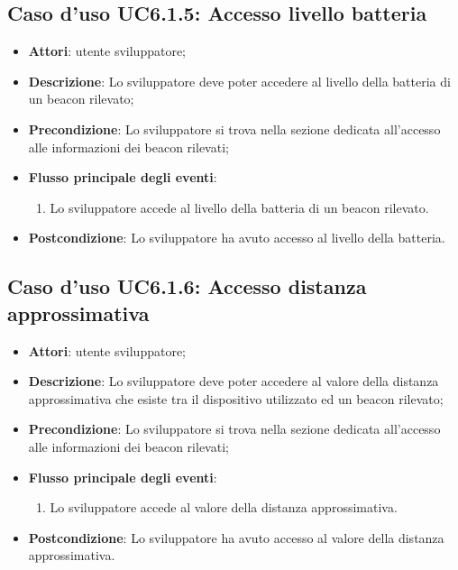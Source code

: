 \documentclass[../AnalisiDeiRequisiti.tex]{subfiles}
\begin{document}
\subsection{Caso d'uso UC6.1.5: Accesso livello batteria}
\begin{itemize}
	\item \textbf{Attori}: utente sviluppatore;
	\item \textbf{Descrizione}: Lo sviluppatore deve poter accedere al livello della batteria di un beacon rilevato; 
	\item \textbf{Precondizione}: Lo sviluppatore si trova nella sezione dedicata all'accesso alle informazioni dei beacon rilevati;
	
	\item \textbf{Flusso principale degli eventi}:
	\begin{enumerate}
		\item Lo sviluppatore accede al livello della batteria di un beacon rilevato.
		
	\end{enumerate}
	\item \textbf{Postcondizione}: Lo sviluppatore ha avuto accesso al livello della batteria.
\end{itemize}
\hypertarget{UC6.1.6}{}
\subsection{Caso d'uso UC6.1.6: Accesso distanza approssimativa}
\begin{itemize}
	\item \textbf{Attori}: utente sviluppatore;
	\item \textbf{Descrizione}: Lo sviluppatore deve poter accedere al valore della distanza approssimativa che esiste tra il dispositivo utilizzato ed un beacon rilevato; 
	\item \textbf{Precondizione}: Lo sviluppatore si trova nella sezione dedicata all'accesso alle informazioni dei beacon rilevati;
	
	\item \textbf{Flusso principale degli eventi}:
	\begin{enumerate}
		\item Lo sviluppatore accede al valore della distanza approssimativa.
		
	\end{enumerate}
	\item \textbf{Postcondizione}: Lo sviluppatore ha avuto accesso al valore della distanza approssimativa.
\end{itemize}
\hypertarget{UC6.1.7}{}
\end{document}
